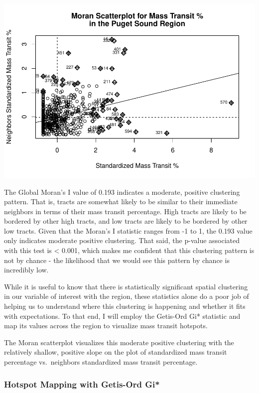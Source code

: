 \documentclass[
]{article}
\begin{document}
\includegraphics{transit-hotspots-PSRC_files/figure-latex/unnamed-chunk-11-1.pdf}

The Global Moran's I value of 0.193 indicates a moderate, positive
clustering pattern. That is, tracts are somewhat likely to be similar to
their immediate neighbors in terms of their mass transit percentage.
High tracts are likely to be bordered by other high tracts, and low
tracts are likely to be bordered by other low tracts. Given that the
Moran's I statistic ranges from -1 to 1, the 0.193 value only indicates
moderate positive clustering. That said, the p-value associated with
this test is \textless{} 0.001, which makes me confident that this
clustering pattern is not by chance - the likelihood that we would see
this pattern by chance is incredibly low.

While it is useful to know that there is statistically significant
spatial clustering in our variable of interest with the region, these
statistics alone do a poor job of helping us to understand where this
clustering is happening and whether it fits with expectations. To that
end, I will employ the Getis-Ord Gi* statistic and map its values across
the region to visualize mass transit hotspots.

The Moran scatterplot visualizes this moderate positive clustering with
the relatively shallow, positive slope on the plot of standardized mass
transit percentage vs.~neighbors standardized mass transit percentage.

\newpage

\subsubsection{Hotspot Mapping with Getis-Ord
Gi*}\label{hotspot-mapping-with-getis-ord-gi}
\end{document}
